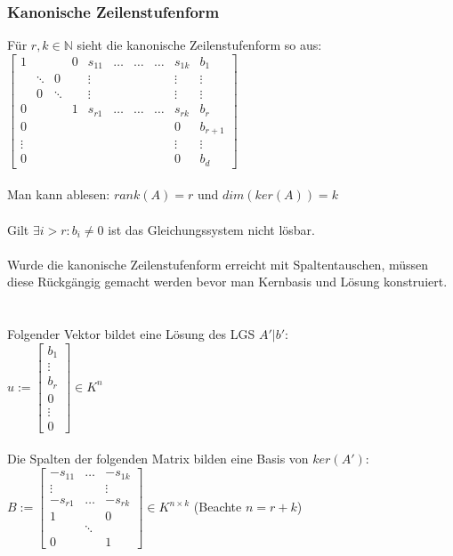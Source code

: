 \documentclass{article}
\begin{document}
\subsubsection*{Kanonische Zeilenstufenform}
Für \(r,k \in \mathbb N\) sieht die kanonische Zeilenstufenform so aus:\\
\(\begin{bmatrix}
    1 &  &  & 0 & s_{11} & \hdots & \hdots & \hdots & s_{1k} & b_1 \\
     & \ddots & 0 &  & \vdots & & & & \vdots & \vdots \\
     & 0 & \ddots &  & \vdots & & & & \vdots & \vdots \\
    0 &  &  & 1 & s_{r1} & \hdots & \hdots & \hdots & s_{rk} & b_r \\
    0 & & & & & & & & 0 & b_{r+1} \\
    \vdots & & & & & & & & \vdots & \vdots \\
    0 & & & & & & & & 0 & b_{d}
\end{bmatrix}\) \\ \\
Man kann ablesen: \(rank(A) = r\) und \(dim(ker(A)) = k\) \\ \\
Gilt \(\exists i > r: b_i \ne 0\) ist das Gleichungssystem nicht lösbar. \\ \\
Wurde die kanonische Zeilenstufenform erreicht mit Spaltentauschen, müssen diese Rückgängig gemacht werden bevor man Kernbasis und Lösung konstruiert. \\ \\ \\
Folgender Vektor bildet eine Lösung des LGS \(A'|b'\): \\
\(u := \begin{bmatrix}
    b_1 \\
    \vdots \\
    b_r \\
    0 \\
    \vdots \\
    0
\end{bmatrix} \in K^n\)
\\ \\
Die Spalten der folgenden Matrix bilden eine Basis von \(ker(A')\): \\
\(B := \begin{bmatrix}
    -s_{11} & \hdots & -s_{1k} \\
    \vdots & & \vdots \\
    -s_{r1} & \hdots & -s_{rk} \\
    1 & & 0 \\
    & \ddots & \\
    0 & & 1
\end{bmatrix} \in K^{n \times k}\) (Beachte \(n = r + k\)) \\ \\
\end{document}
